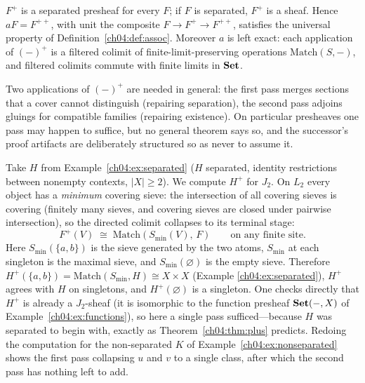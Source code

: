 \begin{theorem}\label{ch04:thm:plus}
$F^{+}$ is a separated presheaf for every $F$; if $F$ is separated, $F^{+}$ is
a sheaf. Hence $aF=F^{++}$, with unit the composite $F\to F^{+}\to F^{++}$,
satisfies the universal property of Definition~\ref{ch04:def:assoc}. Moreover
$a$ is left exact: each application of $(-)^{+}$ is a filtered colimit of
finite-limit-preserving operations $\mathrm{Match}(S,-)$, and filtered
colimits commute with finite limits in $\mathbf{Set}$.
\end{theorem}

Two applications of $(-)^{+}$ are needed in general: the first pass merges
sections that a cover cannot distinguish (repairing separation), the second
pass adjoins gluings for compatible families (repairing existence). On
particular presheaves one pass may happen to suffice, but no general theorem
says so, and the successor's proof artifacts are deliberately structured so as
never to assume it.

\begin{example}\label{ch04:ex:plusworked}
Take $H$ from Example~\ref{ch04:ex:separated} ($H$ separated, identity
restrictions between nonempty contexts, $|X|\ge 2$). We compute $H^{+}$ for
$J_2$. On $L_2$ every object has a \emph{minimum} covering sieve: the
intersection of all covering sieves is covering (finitely many sieves, and
covering sieves are closed under pairwise intersection), so the directed
colimit collapses to its terminal stage:
\[
F^{+}(V)\;\cong\;\mathrm{Match}(S_{\min}(V),\,F)
\qquad\text{on any finite site.}
\]
Here $S_{\min}(\{a,b\})$ is the sieve generated by the two atoms,
$S_{\min}$ at each singleton is the maximal sieve, and
$S_{\min}(\varnothing)$ is the empty sieve. Therefore
$H^{+}(\{a,b\})=\mathrm{Match}(S_{\min},H)\cong X\times X$ (Example
\ref{ch04:ex:separated}), $H^{+}$ agrees with $H$ on singletons, and
$H^{+}(\varnothing)$ is a singleton. One checks directly that $H^{+}$ is
already a $J_2$-sheaf (it is isomorphic to the function presheaf
$\mathbf{Set}(-,X)$ of Example~\ref{ch04:ex:functions}), so here a single pass
sufficed---because $H$ was separated to begin with, exactly as
Theorem~\ref{ch04:thm:plus} predicts. Redoing the computation for the
non-separated $K$ of Example~\ref{ch04:ex:nonseparated} shows the first pass
collapsing $u$ and $v$ to a single class, after which the second pass has
nothing left to add.
\end{example}

